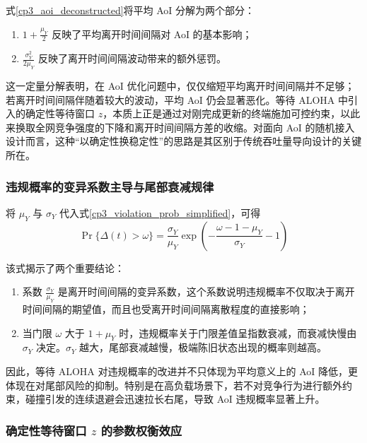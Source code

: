 式\eqref{cp3_aoi_deconstructed}将平均 AoI 分解为两个部分：
\begin{enumerate}[wide]
    \item $1 + \frac{\mu_Y}{2}$ 反映了平均离开时间间隔对 AoI 的基本影响；
    \item $\frac{\sigma_Y^2}{2\mu_Y}$ 反映了离开时间间隔波动带来的额外惩罚。
\end{enumerate}

这一定量分解表明，在 AoI 优化问题中，仅仅缩短平均离开时间间隔并不足够；若离开时间间隔伴随着较大的波动，平均 AoI 仍会显著恶化。等待 ALOHA 中引入的确定性等待窗口 $z$，本质上正是通过对刚完成更新的终端施加可控约束，以此来换取全网竞争强度的下降和离开时间间隔方差的收缩。对面向 AoI 的随机接入设计而言，这种“以确定性换稳定性”的思路是其区别于传统吞吐量导向设计的关键所在。

\subsubsection{违规概率的变异系数主导与尾部衰减规律}

将 $\mu_Y$ 与 $\sigma_Y$ 代入式\eqref{cp3_violation_prob_simplified}，可得
\begin{equation}\label{cp3_violation_deconstructed}
    \Pr\{\Delta(t) > \omega\} = \frac{\sigma_Y}{\mu_Y} \exp\left( -\frac{\omega - 1 - \mu_Y}{\sigma_Y} - 1 \right)
\end{equation}

该式揭示了两个重要结论：
\begin{enumerate}[wide]
    \item 系数 $\frac{\sigma_Y}{\mu_Y}$ 是离开时间间隔的变异系数，这个系数说明违规概率不仅取决于离开时间间隔的期望值，而且也受离开时间间隔离散程度的直接影响；
    \item 当门限 $\omega$ 大于 $1+\mu_Y$ 时，违规概率关于门限差值呈指数衰减，而衰减快慢由 $\sigma_Y$ 决定。$\sigma_Y$ 越大，尾部衰减越慢，极端陈旧状态出现的概率则越高。
\end{enumerate}

因此，等待 ALOHA 对违规概率的改进并不只体现为平均意义上的 AoI 降低，更体现在对尾部风险的抑制。特别是在高负载场景下，若不对竞争行为进行额外约束，碰撞引发的连续退避会迅速拉长右尾，导致 AoI 违规概率显著上升。

\subsubsection{确定性等待窗口 \texorpdfstring{$z$}{z} 的参数权衡效应}

